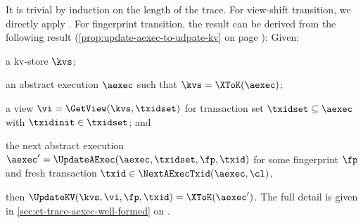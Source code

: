 \begin{proofsketch}
It is trivial by induction on the length of the trace.
For view-shift transition, we directly apply \ih.
For fingerprint transition, the result can be derived from 
the following result (\cref{prop:update-aexec-to-udpate-kv} on page \pageref{sec:update-aexec-kv-store}):
Given:
\begin{enumerate*}
\item a kv-store \( \kvs \);
\item an abstract execution \( \aexec \) such that \( \kvs = \XToK(\aexec)\);
\item a view \( \vi = \GetView(\kvs,\txidset)\) for 
transaction set \( \txidset \subseteq \aexec \) with \( \txidinit \in \txidset \);
and 
\item the next abstract execution 
\( \aexec' = \UpdateAExec(\aexec, \txidset, \fp, \txid) \) for some fingerprint \( \fp \)
and fresh transaction \( \txid \in \NextAExecTxid(\aexec,\cl) \), 
\end{enumerate*}
then \( \UpdateKV(\kvs,\vi,\fp,\txid) = \XToK(\aexec') \).
The full detail is given in \cref{sec:et-trace-aexec-well-formed} on \pageref{sec:et-trace-aexec-well-formed}.
\end{proofsketch}


